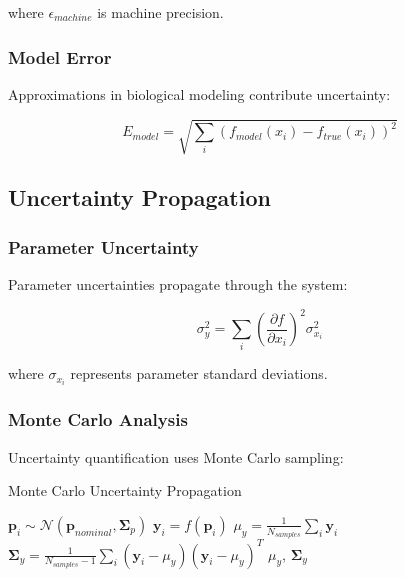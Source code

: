 \documentclass[12pt,a4paper]{article}
\begin{document}
where $\epsilon_{machine}$ is machine precision.

\subsubsection{Model Error}

Approximations in biological modeling contribute uncertainty:

\begin{equation}
E_{model} = \sqrt{\sum_i (f_{model}(x_i) - f_{true}(x_i))^2}
\end{equation}

\subsection{Uncertainty Propagation}

\subsubsection{Parameter Uncertainty}

Parameter uncertainties propagate through the system:

\begin{equation}
\sigma_y^2 = \sum_i \left(\frac{\partial f}{\partial x_i}\right)^2 \sigma_{x_i}^2
\end{equation}

where $\sigma_{x_i}$ represents parameter standard deviations.

\subsubsection{Monte Carlo Analysis}

Uncertainty quantification uses Monte Carlo sampling:

\begin{algorithm}
\caption{Monte Carlo Uncertainty Propagation}
\begin{algorithmic}
        \State $\mathbf{p}_i \sim \mathcal{N}(\mathbf{p}_{nominal}, \boldsymbol{\Sigma}_p)$
        \State $\mathbf{y}_i = f(\mathbf{p}_i)$
    \EndFor
    \State $\mu_y = \frac{1}{N_{samples}} \sum_i \mathbf{y}_i$
    \State $\boldsymbol{\Sigma}_y = \frac{1}{N_{samples}-1} \sum_i (\mathbf{y}_i - \mu_y)(\mathbf{y}_i - \mu_y)^T$
    \State \Return $\mu_y$, $\boldsymbol{\Sigma}_y$
\EndProcedure
\end{algorithmic}
\end{algorithm}
\end{document}
